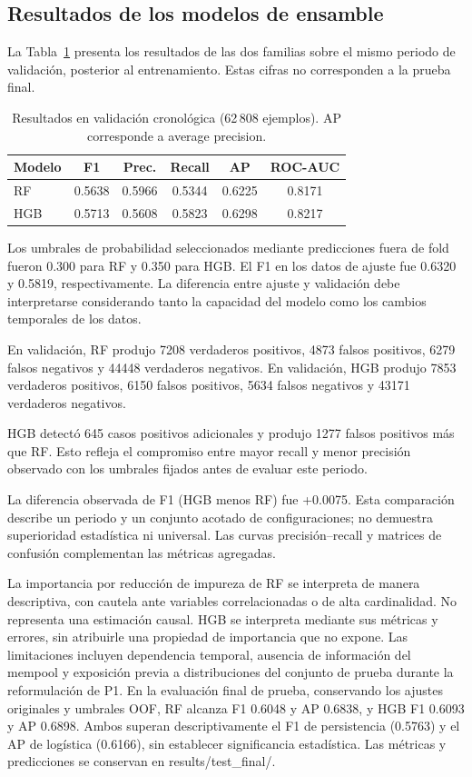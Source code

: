\subsection{Resultados de los modelos de ensamble}
La Tabla~\ref{tab:ensambles-validacion} presenta los resultados de las dos familias sobre el mismo periodo de validación, posterior al entrenamiento. Estas cifras no corresponden a la prueba final.

\begin{table}[htbp]
\caption{Resultados en validación cronológica (62\,808 ejemplos). AP corresponde a average precision.}
\label{tab:ensambles-validacion}
\centering
\small
\begin{tabular}{lccccc}
\hline
Modelo & F1 & Prec. & Recall & AP & ROC-AUC \\
\hline
RF & 0.5638 & 0.5966 & 0.5344 & 0.6225 & 0.8171 \\
HGB & 0.5713 & 0.5608 & 0.5823 & 0.6298 & 0.8217 \\
\hline
\end{tabular}
\end{table}

Los umbrales de probabilidad seleccionados mediante predicciones fuera de fold fueron 0.300 para RF y 0.350 para HGB. El F1 en los datos de ajuste fue 0.6320 y 0.5819, respectivamente. La diferencia entre ajuste y validación debe interpretarse considerando tanto la capacidad del modelo como los cambios temporales de los datos.

En validación, RF produjo 7208 verdaderos positivos, 4873 falsos positivos, 6279 falsos negativos y 44448 verdaderos negativos. En validación, HGB produjo 7853 verdaderos positivos, 6150 falsos positivos, 5634 falsos negativos y 43171 verdaderos negativos.

HGB detectó 645 casos positivos adicionales y produjo 1277 falsos positivos más que RF. Esto refleja el compromiso entre mayor recall y menor precisión observado con los umbrales fijados antes de evaluar este periodo.

La diferencia observada de F1 (HGB menos RF) fue +0.0075. Esta comparación describe un periodo y un conjunto acotado de configuraciones; no demuestra superioridad estadística ni universal. Las curvas precisión--recall y matrices de confusión complementan las métricas agregadas.

La importancia por reducción de impureza de RF se interpreta de manera descriptiva, con cautela ante variables correlacionadas o de alta cardinalidad. No representa una estimación causal. HGB se interpreta mediante sus métricas y errores, sin atribuirle una propiedad de importancia que no expone. Las limitaciones incluyen dependencia temporal, ausencia de información del mempool y exposición previa a distribuciones del conjunto de prueba durante la reformulación de P1. En la evaluación final de prueba, conservando los ajustes originales y umbrales OOF, RF alcanza F1 0.6048 y AP 0.6838, y HGB F1 0.6093 y AP 0.6898. Ambos superan descriptivamente el F1 de persistencia (0.5763) y el AP de logística (0.6166), sin establecer significancia estadística. Las métricas y predicciones se conservan en results/test\_final/.

